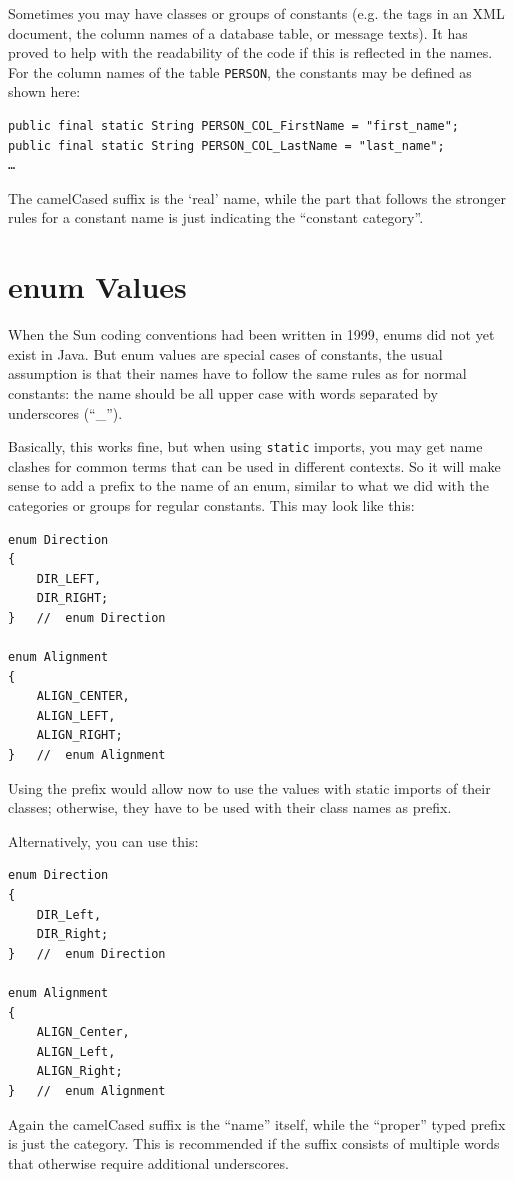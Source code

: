 \documentclass[11pt,a4paper, titlepage, parskip=half, headsepline, footsepline, cleardoublepage=current, headheight=1cm]{scrbook}
\begin{document}
Sometimes you may have classes or groups of constants (e.g. the tags in an XML document, the column names of a database table, or message texts). It has proved to help with the readability of the code if this is reflected in the names. For the column names of the table \verb#PERSON#, the constants may be defined as shown here:
\begin{lstlisting}
public final static String PERSON_COL_FirstName = "first_name";
public final static String PERSON_COL_LastName = "last_name";
…
\end{lstlisting}
The camelCased suffix is the ‘real’ name, while the part that follows the stronger rules for a constant name is just indicating the “constant category”.

\section{enum Values}\label{sec:EnumValues}
When the Sun coding conventions\autocite{SUN_CODE_CONVENTIONS} had been written in 1999, enums did not yet exist in Java. But enum values are special cases of constants, the usual assumption is that their names have to follow the same rules as for normal constants: the name should be all upper case with words separated by underscores (“\_”).

Basically, this works fine, but when using \lstinline|static| imports, you may get name clashes for common terms that can be used in different contexts. So it will make sense to add a prefix to the name of an enum, similar to what we did with the categories or groups for regular constants. This may look like this:
\begin{lstlisting}
enum Direction
{
    DIR_LEFT,
    DIR_RIGHT;
}   //  enum Direction

enum Alignment
{
    ALIGN_CENTER,
    ALIGN_LEFT,
    ALIGN_RIGHT;
}   //  enum Alignment
\end{lstlisting}
Using the prefix would allow now to use the values with static imports of their classes; otherwise, they have to be used with their class names as prefix.

Alternatively, you can use this:
\begin{lstlisting}
enum Direction
{
    DIR_Left,
    DIR_Right;
}   //  enum Direction

enum Alignment
{
    ALIGN_Center,
    ALIGN_Left,
    ALIGN_Right;
}   //  enum Alignment
\end{lstlisting}
Again the camelCased suffix is the “name” itself, while the “proper” typed prefix is just the category. This is recommended if the suffix consists of multiple words that otherwise require additional underscores.
\end{document}
